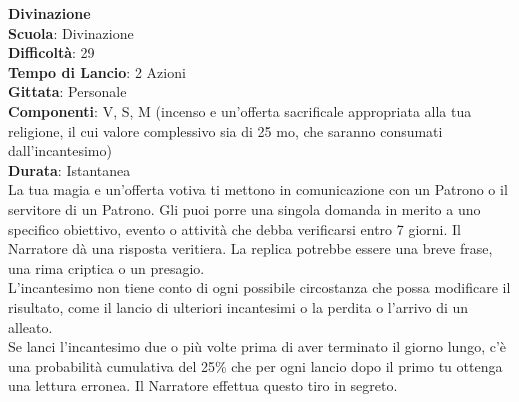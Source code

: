 \begin{multicols}{2}
\medskip\textbf{Divinazione}\\
\textbf{Scuola}: Divinazione\\
\textbf{Difficoltà}: 29\\
\textbf{Tempo di Lancio}: 2 Azioni\\
\textbf{Gittata}: Personale\\
\textbf{Componenti}: V, S, M (incenso e un'offerta sacrificale appropriata alla tua religione, il cui valore complessivo sia di 25 mo, che saranno consumati dall'incantesimo)\\
\textbf{Durata}: Istantanea\\
La tua magia e un'offerta votiva ti mettono in comunicazione con un Patrono o il servitore di un Patrono. Gli puoi porre una singola domanda in merito a uno specifico obiettivo, evento o attività che debba verificarsi entro 7 giorni. Il Narratore dà una risposta veritiera. La replica potrebbe essere una breve frase, una rima criptica o un presagio. \\
L'incantesimo non tiene conto di ogni possibile circostanza che possa modificare il risultato, come il lancio di ulteriori incantesimi o la perdita o l'arrivo di un alleato.\\
Se lanci l'incantesimo due o più volte prima di aver terminato il giorno lungo, c'è una probabilità cumulativa del 25\% che per ogni lancio dopo il primo tu ottenga una lettura erronea. Il Narratore effettua questo tiro in segreto. 


\end{multicols}
